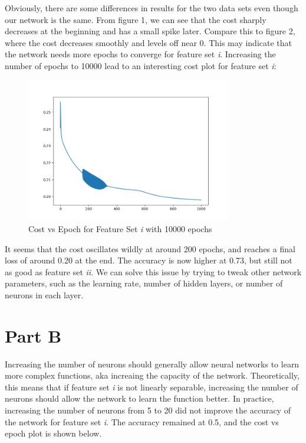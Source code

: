 \documentclass{article}
\begin{document}
Obviously, there are some differences in results for the two data sets even though our network is the same.
From figure 1, we can see that the cost sharply decreases at the beginning and has a small spike later.
Compare this to figure 2, where the cost decreases smoothly and levels off near 0.
This may indicate that the network needs more epochs to converge for feature set \textit{i}.
Increasing the number of epochs to 10000 lead to an interesting cost plot for feature set \textit{i}:

\begin{figure}[H]
  \centering
  \includegraphics[width=0.8\textwidth]{Figure_3.png}
  \caption{Cost vs Epoch for Feature Set \textit{i} with 10000 epochs}
\end{figure}

It seems that the cost oscillates wildly at around 200 epochs, and reaches a final loss of around 0.20 at the end.
The accuracy is now higher at 0.73, but still not as good as feature set \textit{ii}.
We can solve this issue by trying to tweak other network parameters, such as the learning rate, number of hidden layers, or number of neurons in each layer.

\section{Part B}

Increasing the number of neurons should generally allow neural networks to learn more complex functions, aka increaing the capacity of the network.
Theoretically, this means that if feature set \textit{i} is not linearly separable, increasing the number of neurons should allow the network to learn the function better.
In practice, increasing the number of neurons from 5 to 20 did not improve the accuracy of the network for feature set \textit{i}.
The accuracy remained at 0.5, and the cost vs epoch plot is shown below.
\end{document}

